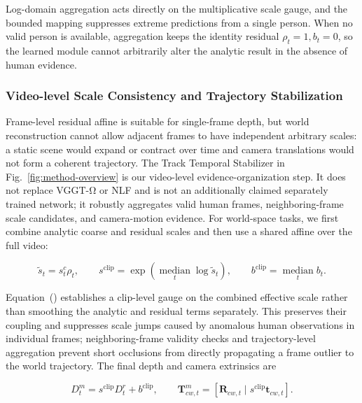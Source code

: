 \documentclass{article}
\begin{document}
Log-domain aggregation acts directly on the multiplicative scale gauge, and the bounded mapping suppresses extreme predictions from a single person. When no valid person is available, aggregation keeps the identity residual $\rho_t=1,b_t=0$, so the learned module cannot arbitrarily alter the analytic result in the absence of human evidence.

\subsubsection{Video-level Scale Consistency and Trajectory Stabilization}

Frame-level residual affine is suitable for single-frame depth, but world reconstruction cannot allow adjacent frames to have independent arbitrary scales: a static scene would expand or contract over time and camera translations would not form a coherent trajectory. The Track Temporal Stabilizer in Fig.~\ref{fig:method-overview} is our video-level evidence-organization step. It does not replace VGGT-Ω or NLF and is not an additionally claimed separately trained network; it robustly aggregates valid human frames, neighboring-frame scale candidates, and camera-motion evidence. For world-space tasks, we first combine analytic coarse and residual scales and then use a shared affine over the full video:

\begin{equation}
\widetilde{s}_t=s_t^c\rho_t,\qquad
s^{\mathrm{clip}}=\exp\!\left(
\operatorname*{median}_t\log\widetilde{s}_t\right),\qquad
b^{\mathrm{clip}}=\operatorname*{median}_tb_t.
\label{eq:clip-affine}
\end{equation}

Equation~() establishes a clip-level gauge on the combined effective scale rather than smoothing the analytic and residual terms separately. This preserves their coupling and suppresses scale jumps caused by anomalous human observations in individual frames; neighboring-frame validity checks and trajectory-level aggregation prevent short occlusions from directly propagating a frame outlier to the world trajectory. The final depth and camera extrinsics are

\begin{equation}
D_t^m=s^{\mathrm{clip}}D_t^r+b^{\mathrm{clip}},\qquad
\mathbf{T}_{cw,t}^{m}=
\left[\mathbf{R}_{cw,t}\mid s^{\mathrm{clip}}\mathbf{t}_{cw,t}\right].
\label{eq:camera-scale}
\end{equation}
\end{document}
